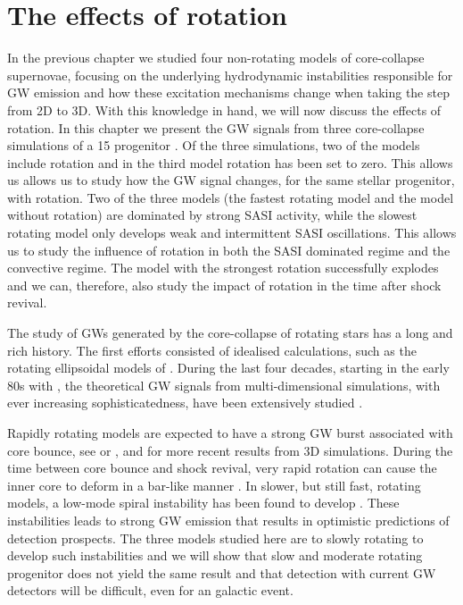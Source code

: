 

\chapter{The effects of rotation} \label{ch:paper2}
In the previous chapter we studied four non-rotating models of core-collapse
supernovae, focusing on the underlying hydrodynamic instabilities responsible
for GW emission and how these excitation mechanisms change when taking the step from
2D to 3D. With this knowledge in hand, we will now discuss the effects of rotation.
In this chapter we present the GW signals from three core-collapse simulations of a 15 \msun  
progenitor \citep{heger_05}. Of the three simulations, two of the models include rotation
and in the third model rotation has been set to zero. This allows us allows us to study
how the GW signal changes, for the same stellar progenitor, with rotation.
Two of the three models (the fastest rotating model and the model without rotation)
are dominated by strong SASI activity, while the slowest rotating model only develops weak and intermittent SASI oscillations. 
This allows us to study the influence of rotation in both the SASI dominated regime and the convective regime. The model with the strongest
rotation successfully explodes and we can, therefore, also study the impact of rotation in the time after shock revival.

The study of GWs generated by the core-collapse of rotating stars
has a long and rich history. The first efforts consisted of idealised calculations, 
such as the rotating ellipsoidal models of \cite{thuan_74,novikov_76,shapiro_77,saenz_78,saenz_79,saenz_81}.
During the last four decades, starting in the early 80s with \cite{mueller_82}, the theoretical GW signals from multi-dimensional
simulations, with ever increasing sophisticatedness, have been extensively studied 
\citep{mueller_82,finn_90,moenchmeyer_91,yamada_95,zwerger_97,rampp_98,dimmelmeier_01,dimmelmeier_phd,
dimmelmeier_02_b,kotake_03,ott_04,yamada_04,shibata_04,cerda_05,saijo_05,ott_05,shibata_05,kotake_06,
obergaulinger_06b,ott_phd,dimmelmeier_07_a,dimmelmeier_07_bb,dimmelmeier_08,reisswig_11,
takiwaki_11,ott_12,kuroda_14,fuller_15}.

Rapidly rotating models are expected to have a strong GW burst associated with core bounce, 
see \cite{mueller_82} or  \cite{kuroda_14}, and \cite{fuller_15} for more recent results from 3D simulations.
During the time between core bounce and shock revival, very rapid rotation can cause
the inner core to deform in a bar-like manner \citep{rampp_98,shibata_05}.
In slower, but still fast, rotating models, 
a low-mode spiral instability has been found to develop 
\citep{ott_05,kuroda_14,takiwaki_16}. These instabilities leads to strong
GW emission that results in optimistic predictions of detection prospects.
The three models studied here are to slowly rotating to develop such instabilities 
and we will show that slow and moderate rotating progenitor does not yield the same
result and that detection with current GW detectors will be difficult, even for an
galactic event.

